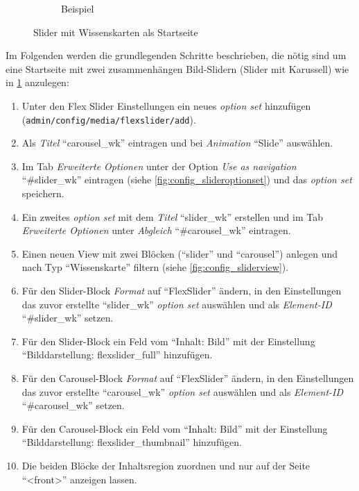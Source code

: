 \begin{figure}[H]
\begin{subfigure}[b]{0.45\textwidth}
		\caption[]{Beispiel}
		\label{fig:example_slider}
	\end{subfigure}
	\caption{Slider mit Wissenskarten als Startseite}
	\label{fig:slider}
\end{figure}

Im Folgenden werden die grundlegenden Schritte beschrieben, die nötig sind um eine Startseite mit zwei zusammenhängen Bild-Slidern (Slider mit Karussell) wie in \cref{fig:example_slider} anzulegen:
\begin{enumerate}
	\item Unter den Flex Slider Einstellungen ein neues \textit{option set} hinzufügen (\lstinline|admin/config/media/flexslider/add|).
	\item Als \textit{Titel} \enquote{carousel\_wk} eintragen und bei \textit{Animation} \enquote{Slide} auswählen.
	\item Im Tab \textit{Erweiterte Optionen} unter der Option \textit{Use as navigation} \enquote{\#slider\_wk} eintragen (siehe \cref{fig:config_slideroptionset}) und das \textit{option set} speichern.
	\item Ein zweites \textit{option set} mit dem \textit{Titel} \enquote{slider\_wk} erstellen und im Tab \textit{Erweiterte Optionen} unter \textit{Abgleich} \enquote{\#carousel\_wk} eintragen.
	\item Einen neuen View mit zwei Blöcken (\enquote{slider} und \enquote{carousel}) anlegen und nach Typ \enquote{Wissenskarte} filtern (siehe \cref{fig:config_sliderview}).
	\item Für den Slider-Block \textit{Format} auf \enquote{FlexSlider} ändern, in den Einstellungen das zuvor erstellte \enquote{slider\_wk} \textit{option set} auswählen und als \textit{Element-ID} \enquote{\#slider\_wk} setzen.
	\item Für den Slider-Block ein Feld vom \enquote{Inhalt: Bild} mit der Einstellung \enquote{Bilddarstellung: flexslider\_full} hinzufügen.
	\item Für den Carousel-Block \textit{Format} auf \enquote{FlexSlider} ändern, in den Einstellungen das zuvor erstellte \enquote{carousel\_wk} \textit{option set} auswählen und als \textit{Element-ID} \enquote{\#carousel\_wk} setzen.
	\item Für den Carousel-Block ein Feld vom \enquote{Inhalt: Bild} mit der Einstellung \enquote{Bilddarstellung: flexslider\_thumbnail} hinzufügen.
	\item Die beiden Blöcke der Inhaltsregion zuordnen und nur auf der Seite \enquote{<front>} anzeigen lassen.
\end{enumerate}




